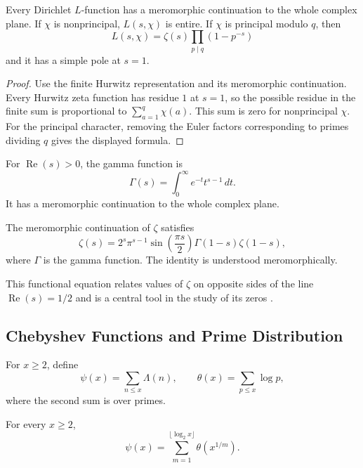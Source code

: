 \begin{corollary}
Every Dirichlet $L$-function has a meromorphic continuation to the whole complex plane. If $\chi$ is nonprincipal, $L(s,\chi)$ is entire. If $\chi$ is principal modulo $q$, then
\[
 L(s,\chi)=\zeta(s)\prod_{p\mid q}(1-p^{-s})
\]
and it has a simple pole at $s=1$.
\end{corollary}

\begin{proof}
Use the finite Hurwitz representation and its meromorphic continuation. Every Hurwitz zeta function has residue $1$ at $s=1$, so the possible residue in the finite sum is proportional to $\sum_{a=1}^{q}\chi(a)$. This sum is zero for nonprincipal $\chi$. For the principal character, removing the Euler factors corresponding to primes dividing $q$ gives the displayed formula.
\end{proof}

\begin{definition}
For $\operatorname{Re}(s)>0$, the gamma function is
\[
 \Gamma(s)=\int_0^{\infty}e^{-t}t^{s-1}\,dt.
\]
It has a meromorphic continuation to the whole complex plane.
\end{definition}

\begin{theorem}
The meromorphic continuation of $\zeta$ satisfies
\[
 \zeta(s)=2^s\pi^{s-1}\sin\!\left(\frac{\pi s}{2}\right)
 \Gamma(1-s)\zeta(1-s),
\]
where $\Gamma$ is the gamma function. The identity is understood meromorphically.
\end{theorem}

This functional equation relates values of $\zeta$ on opposite sides of the line $\operatorname{Re}(s)=1/2$ and is a central tool in the study of its zeros \cite[Chapter 12]{Apostol1976-xj}.

\subsection{Chebyshev Functions and Prime Distribution}

\begin{definition}
For $x\geq2$, define
\[
 \psi(x)=\sum_{n\leq x}\Lambda(n),
 \qquad
 \theta(x)=\sum_{p\leq x}\log p,
\]
where the second sum is over primes.
\end{definition}

\begin{proposition}
For every $x\geq2$,
\[
 \psi(x)=\sum_{m=1}^{\lfloor\log_2 x\rfloor}\theta\!\left(x^{1/m}\right).
\]
\end{proposition}

